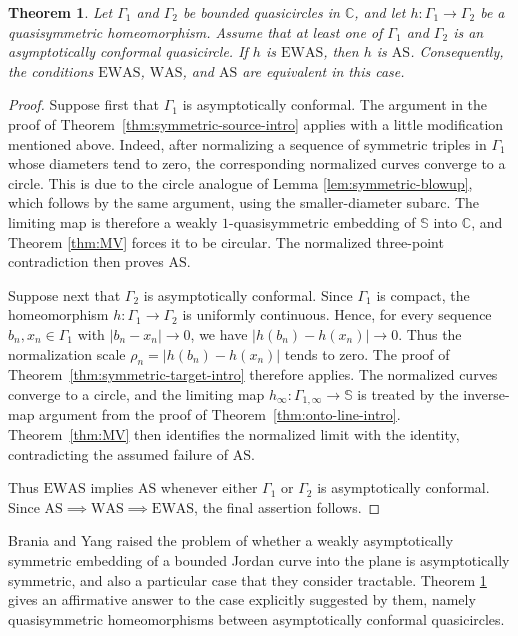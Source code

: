 \documentclass[11pt]{amsart}
\numberwithin{equation}{section}
\newtheorem{theorem}{Theorem}[section]
\theoremstyle{definition} %
\theoremstyle{remarkstyle}
\newcommand{\C}{\mathbb{C}}
\begin{document}
\begin{theorem}\label{thm:compact-one-symmetric}
Let $\Gamma_1$ and $\Gamma_2$ be bounded quasicircles in $\C$, and let $h\colon\Gamma_1\to\Gamma_2$ be a quasisymmetric homeomorphism. 
Assume that at least one of $\Gamma_1$ and $\Gamma_2$ is an asymptotically conformal quasicircle.  
If $h$ is $\mathrm{EWAS}$, then $h$ is $\mathrm{AS}$.  
Consequently, the conditions $\mathrm{EWAS}$, $\mathrm{WAS}$, and $\mathrm{AS}$ are equivalent in this case.
\end{theorem}

\begin{proof}
Suppose first that $\Gamma_1$ is asymptotically conformal.  
The argument in the proof of Theorem~\ref{thm:symmetric-source-intro} applies with a little modification mentioned above.
Indeed, after normalizing a sequence of symmetric triples in $\Gamma_1$ whose diameters tend to zero, the corresponding normalized curves converge to a circle. This is due to 
the circle analogue of Lemma \ref{lem:symmetric-blowup}, which follows by the same argument, using the smaller-diameter subarc. 
The limiting map is therefore a weakly $1$-quasisymmetric embedding of $\mathbb S$ into $\C$, and Theorem \ref{thm:MV} forces it to be circular.  
The normalized three-point contradiction then proves $\mathrm{AS}$.

Suppose next that $\Gamma_2$ is asymptotically conformal.  
Since $\Gamma_1$ is compact, the homeomorphism $h\colon\Gamma_1\to\Gamma_2$ is uniformly continuous.  
Hence, for every sequence $b_n,x_n\in\Gamma_1$ with $|b_n-x_n|\to 0$, we have $|h(b_n)-h(x_n)|\to 0$.
Thus the normalization scale $\rho_n=|h(b_n)-h(x_n)|$ tends to zero.  
The proof of Theorem~\ref{thm:symmetric-target-intro} therefore applies. 
The normalized curves converge to a circle, and the limiting map $h_\infty\colon\Gamma_{1,\infty}\to\mathbb S$ is treated by the inverse-map argument from the proof of Theorem~\ref{thm:onto-line-intro}.  
Theorem~\ref{thm:MV} then identifies the normalized limit with the identity, contradicting the assumed failure of $\mathrm{AS}$.

Thus $\mathrm{EWAS}$ implies $\mathrm{AS}$ whenever either $\Gamma_1$ or $\Gamma_2$ is asymptotically conformal. 
Since $\mathrm{AS}\implies\mathrm{WAS}\implies\mathrm{EWAS}$, the final assertion follows.
\end{proof}


Brania and Yang \cite[p.2678]{BraniaYang} raised the problem of whether a weakly asymptotically symmetric embedding of a bounded Jordan curve into the plane is asymptotically symmetric, and also a particular case that they consider tractable.
Theorem \ref{thm:compact-one-symmetric} gives an affirmative answer to the case explicitly suggested by them, namely quasisymmetric homeomorphisms between asymptotically conformal quasicircles.
\end{document}
